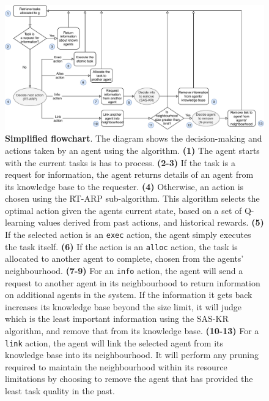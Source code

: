 \begin{figure}[ht]
	\centering
	\includegraphics[width=0.8\linewidth, trim={65pt 0pt 65pt 0pt, clip}]{ataria-simplified}
	\caption{\textbf{Simplified \acronymATARIA{}{} flowchart}. The diagram shows the decision-making and actions taken by an agent using the \acronymATARIA{}{}  algorithm. \newline
		\textbf{(1)} The agent starts with the current tasks is has to process. \newline
		\textbf{(2-3)} If the task is a request for information, the agent returns details of an agent from its knowledge base to the requester. \newline
		\textbf{(4)} Otherwise, an action is chosen using the RT-ARP sub-algorithm. This algorithm selects the optimal action given the agents current state, based on a set of Q-learning values derived from past actions, and historical rewards.  \newline
		\textbf{(5)} If the selected action is an \texttt{exec} action, the agent simply executes the task itself. \newline
		\textbf{(6)} If the action is an \texttt{alloc} action, the task is allocated to another agent to complete, chosen from the agents' neighbourhood. \newline
		\textbf{(7-9)} For an \texttt{info} action, the agent will send a request to another agent in its neighbourhood to return information on additional agents in the system. If the information it gets back increases its knowledge base beyond the size limit, it will judge which is the least important information using the SAS-KR algorithm, and remove that from its knowledge base. \newline
		\textbf{(10-13)} For a \texttt{link} action, the agent will link the selected agent from its knowledge base into its neighbourhood. It will perform any pruning required to maintain the neighbourhood within its resource limitations by choosing to remove the agent that has provided the least task quality in the past. \newline
}
	\label{fig:ataria-simplified}
\end{figure}

